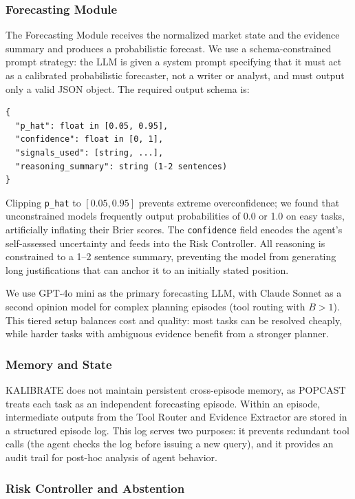 \documentclass{article} %
\newcommand{\agentname}{KALIBRATE}
\newcommand{\benchmarkname}{POPCAST}
\begin{document}
\subsubsection{Forecasting Module}

The Forecasting Module receives the normalized market state and the evidence summary and produces a probabilistic forecast. We use a schema-constrained prompt strategy: the LLM is given a system prompt specifying that it must act as a calibrated probabilistic forecaster, not a writer or analyst, and must output only a valid JSON object. The required output schema is:

\begin{verbatim}
{
  "p_hat": float in [0.05, 0.95],
  "confidence": float in [0, 1],
  "signals_used": [string, ...],
  "reasoning_summary": string (1-2 sentences)
}
\end{verbatim}

Clipping \texttt{p\_hat} to $[0.05, 0.95]$ prevents extreme overconfidence; we found that unconstrained models frequently output probabilities of 0.0 or 1.0 on easy tasks, artificially inflating their Brier scores. The \texttt{confidence} field encodes the agent's self-assessed uncertainty and feeds into the Risk Controller. All reasoning is constrained to a 1--2 sentence summary, preventing the model from generating long justifications that can anchor it to an initially stated position.

We use GPT-4o mini as the primary forecasting LLM, with Claude Sonnet as a second opinion model for complex planning episodes (tool routing with $B > 1$). This tiered setup balances cost and quality: most tasks can be resolved cheaply, while harder tasks with ambiguous evidence benefit from a stronger planner.

\subsubsection{Memory and State}

\agentname{} does not maintain persistent cross-episode memory, as \benchmarkname{} treats each task as an independent forecasting episode. Within an episode, intermediate outputs from the Tool Router and Evidence Extractor are stored in a structured episode log. This log serves two purposes: it prevents redundant tool calls (the agent checks the log before issuing a new query), and it provides an audit trail for post-hoc analysis of agent behavior.

\subsubsection{Risk Controller and Abstention}
\end{document}
